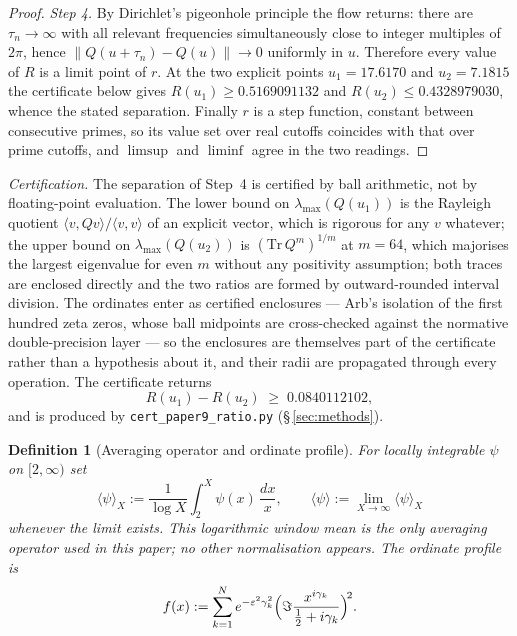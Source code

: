 \documentclass[11pt]{article}
\newtheorem{definition}[theorem]{Definition}
\begin{document}
\begin{proof}
\textit{Step 4.} By Dirichlet's pigeonhole principle the flow returns: there
are $\tau_n\to\infty$ with all relevant frequencies simultaneously close to
integer multiples of $2\pi$, hence $\|Q(u+\tau_n)-Q(u)\|\to 0$ uniformly in
$u$. Therefore every value of $R$ is a limit point of $r$. At the two explicit
points $u_1=17.6170$ and $u_2=7.1815$ the certificate below gives
$R(u_1)\ge 0.5169091132$ and $R(u_2)\le 0.4328979030$, whence the stated
separation. Finally $r$ is a step function, constant between consecutive
primes, so its value set over real cutoffs coincides with that over prime
cutoffs, and $\limsup$ and $\liminf$ agree in the two readings.
\end{proof}

\emph{Certification.} The separation of Step~4 is certified by ball
arithmetic, not by floating-point evaluation. The lower bound on
$\lambda_{\max}(Q(u_1))$ is the Rayleigh quotient $\langle v,Qv\rangle/
\langle v,v\rangle$ of an explicit vector, which is rigorous for any $v$
whatever; the upper bound on $\lambda_{\max}(Q(u_2))$ is
$(\mathrm{Tr}\,Q^{m})^{1/m}$ at $m=64$, which majorises the largest eigenvalue
for even $m$ without any positivity assumption; both traces are enclosed
directly and the two ratios are formed by outward-rounded interval division.
The ordinates enter as certified enclosures --- Arb's isolation of the first
hundred zeta zeros, whose ball midpoints are cross-checked against the
normative double-precision layer --- so the enclosures are themselves part of
the certificate rather than a hypothesis about it, and their radii are
propagated through every operation. The certificate returns
\[
R(u_1)-R(u_2)\;\ge\;0.0840112102,
\]
and is produced by \texttt{cert\_paper9\_ratio.py} (\S\,\ref{sec:methods}).

\begin{definition}[Averaging operator and ordinate profile]
\label{def:mean}
For locally integrable $\psi$ on $[2,\infty)$ set
\[
\langle\psi\rangle_X:=\frac{1}{\log X}\int_2^X\psi(x)\,\frac{dx}{x},
\qquad
\langle\psi\rangle:=\lim_{X\to\infty}\langle\psi\rangle_X
\]
whenever the limit exists. This logarithmic window mean is the only averaging
operator used in this paper; no other normalisation appears. The
\emph{ordinate profile} is
\[
f(x):=\sum_{k=1}^{N}e^{-\varepsilon^2\gamma_k^2}
\Bigl(\Im\frac{x^{i\gamma_k}}{\tfrac12+i\gamma_k}\Bigr)^{\!2}.
\]
\end{definition}
\end{document}
